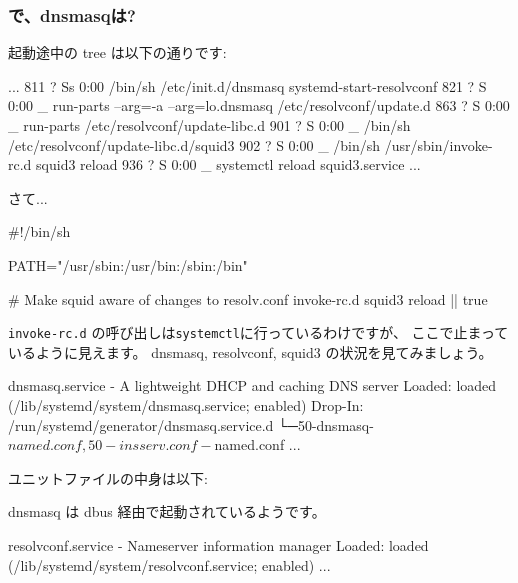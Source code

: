\documentclass[mingoth,a4paper]{jsarticle}
\begin{document}
\subsubsection{で、dnsmasqは?}

起動途中の tree は以下の通りです:
\begin{commandline}
  ...
  811 ?        Ss     0:00 /bin/sh /etc/init.d/dnsmasq systemd-start-resolvconf
  821 ?        S      0:00  \_ run-parts --arg=-a --arg=lo.dnsmasq /etc/resolvconf/update.d
  863 ?        S      0:00      \_ run-parts /etc/resolvconf/update-libc.d
  901 ?        S      0:00          \_ /bin/sh /etc/resolvconf/update-libc.d/squid3
  902 ?        S      0:00              \_ /bin/sh /usr/sbin/invoke-rc.d squid3 reload
  936 ?        S      0:00                  \_ systemctl reload squid3.service
  ...
\end{commandline}
\noindent
さて...
\begin{commandline}
#!/bin/sh

PATH="/usr/sbin:/usr/bin:/sbin:/bin"

# Make squid aware of changes to resolv.conf
invoke-rc.d squid3 reload || true
\end{commandline}
\noindent
\texttt{invoke-rc.d} の呼び出しは\texttt{systemctl}に行っているわけですが、
ここで止まっているように見えます。
dnsmasq, resolvconf, squid3 の状況を見てみましょう。
\begin{commandline}
dnsmasq.service - A lightweight DHCP and caching DNS server
   Loaded: loaded (/lib/systemd/system/dnsmasq.service; enabled)
  Drop-In: /run/systemd/generator/dnsmasq.service.d
           └─50-dnsmasq-$named.conf, 50-insserv.conf-$named.conf
  ...
\end{commandline}
ユニットファイルの中身は以下:
\noindent
dnsmasq は dbus 経由で起動されているようです。
\begin{commandline}
resolvconf.service - Nameserver information manager
   Loaded: loaded (/lib/systemd/system/resolvconf.service; enabled)
   ...
\end{commandline}
\end{document}
